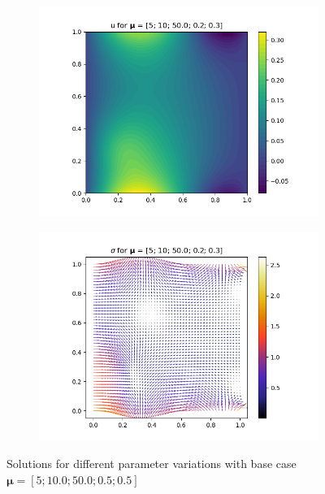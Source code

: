 \begin{figure}[!htb]
\begin{subfigure}{0.4\linewidth}
        \includegraphics[width=\linewidth]{figs/mixed_u_mu45.png}
        \label{subfig:mu45_a}
    \end{subfigure}
    \begin{subfigure}{0.4\linewidth}
        \centering
        \includegraphics[width=\linewidth]{figs/mixed_sig_mu45.png}
        \label{subfig:mu45_b}
    \end{subfigure}
    
    \caption{Solutions for different parameter variations with base case $\bm{\mu} = [5; 10.0; 50.0; 0.5; 0.5]$}
    \label{fig:all_solutions}
\end{figure}

